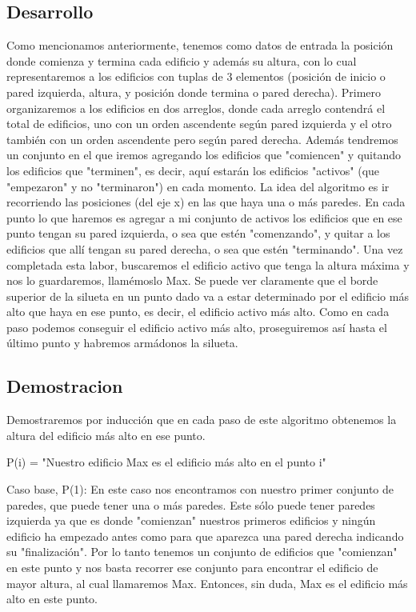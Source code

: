 \subsection{Desarrollo}
Como mencionamos anteriormente, tenemos como datos de entrada la posición donde comienza y termina cada edificio y además su altura, con lo cual representaremos a los edificios con tuplas de 3 elementos (posición de inicio o pared izquierda, altura, y posición donde termina o pared derecha). Primero organizaremos a los edificios en dos arreglos, donde cada arreglo contendrá el total de edificios, uno con un orden ascendente según pared izquierda y el otro también con un orden ascendente pero según pared derecha. Además tendremos un conjunto en el que iremos agregando los edificios que "comiencen" y quitando los edificios que "terminen", es decir, aquí estarán los edificios "activos" (que "empezaron" y no "terminaron") en cada momento.
La idea del algoritmo es ir recorriendo las posiciones (del eje x) en las que haya una o más paredes. En cada punto lo que haremos es agregar a mi conjunto de activos los edificios que en ese punto tengan su pared izquierda, o sea que estén "comenzando", y quitar a los edificios que allí tengan su pared derecha, o sea que estén "terminando". Una vez completada esta labor, buscaremos el edificio activo que tenga la altura máxima y nos lo guardaremos, llamémoslo Max. Se puede ver claramente que el borde superior de la silueta en un punto dado va a estar determinado por el edificio más alto que haya en ese punto, es decir, el edificio activo más alto. Como en cada paso podemos conseguir el edificio activo más alto, proseguiremos así hasta el último punto y habremos armádonos la silueta.

\subsection{Demostracion}
Demostraremos por inducción que en cada paso de este algoritmo obtenemos la altura del edificio más alto en ese punto.

P(i) = "Nuestro edificio Max es el edificio más alto en el punto i"

Caso base, P(1):
En este caso nos encontramos con nuestro primer conjunto de paredes, que puede tener una o más paredes. Este sólo puede tener paredes izquierda ya que es donde "comienzan" nuestros primeros edificios y ningún edificio ha empezado antes como para que aparezca una pared derecha indicando su "finalización". Por lo tanto tenemos un conjunto de edificios que "comienzan" en este punto y nos basta recorrer ese conjunto para encontrar el edificio de mayor altura, al cual llamaremos Max. Entonces, sin duda, Max es el edificio más alto en este punto.

